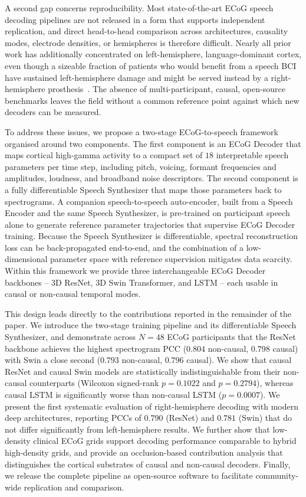\documentclass[11pt]{article}
\begin{document}
A second gap concerns reproducibility. Most state-of-the-art ECoG speech
decoding pipelines are not released in a form that supports independent
replication, and direct head-to-head comparison across architectures,
causality modes, electrode densities, or hemispheres is therefore
difficult. Nearly all prior work has additionally concentrated on
left-hemisphere, language-dominant cortex, even though a sizeable fraction
of patients who would benefit from a speech BCI have sustained
left-hemisphere damage and might be served instead by a right-hemisphere
prosthesis~\cite{lorach2023walking}. The absence of multi-participant,
causal, open-source benchmarks leaves the field without a common reference
point against which new decoders can be measured.

To address these issues, we propose a two-stage ECoG-to-speech framework
organised around two components. The first component is an ECoG Decoder
that maps cortical high-gamma activity to a compact set of $18$
interpretable speech parameters per time step, including pitch, voicing,
formant frequencies and amplitudes, loudness, and broadband noise
descriptors. The second component is a fully differentiable Speech
Synthesizer that maps those parameters back to spectrograms. A companion
speech-to-speech auto-encoder, built from a Speech Encoder and the same
Speech Synthesizer, is pre-trained on participant speech alone to generate
reference parameter trajectories that supervise ECoG Decoder training.
Because the Speech Synthesizer is differentiable, spectral reconstruction
loss can be back-propagated end-to-end, and the combination of a
low-dimensional parameter space with reference supervision mitigates data
scarcity. Within this framework we provide three interchangeable ECoG
Decoder backbones -- 3D ResNet, 3D Swin Transformer, and LSTM -- each
usable in causal or non-causal temporal modes.

This design leads directly to the contributions reported in the remainder
of the paper. We introduce the two-stage training
pipeline and its differentiable Speech Synthesizer, and demonstrate across
$N=48$ ECoG participants that the ResNet backbone achieves the highest
spectrogram PCC ($0.804$ non-causal, $0.798$ causal) with Swin a close
second ($0.793$ non-causal, $0.796$ causal). We show that causal ResNet
and causal Swin models are statistically indistinguishable from their
non-causal counterparts (Wilcoxon signed-rank $p=0.1022$ and $p=0.2794$),
whereas causal LSTM is significantly worse than non-causal LSTM
($p=0.0007$). We present the first systematic evaluation of
right-hemisphere decoding with modern deep architectures, reporting PCCs
of $0.790$ (ResNet) and $0.781$ (Swin) that do not differ significantly
from left-hemisphere results. We further show that low-density clinical
ECoG grids support decoding performance comparable to hybrid high-density
grids, and provide an occlusion-based contribution analysis that
distinguishes the cortical substrates of causal and non-causal decoders.
Finally, we release the complete pipeline as open-source software to
facilitate community-wide replication and comparison.
\end{document}
